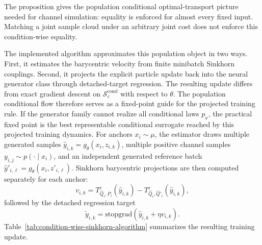 \documentclass[10pt,journal]{IEEEtran}
\begin{document}
The proposition gives the population conditional optimal-transport picture needed for channel simulation: equality is enforced for almost every fixed input.
Matching a joint sample cloud under an arbitrary joint cost does not enforce this condition-wise equality.

The implemented algorithm approximates this population object in two ways.
First, it estimates the barycentric velocity from finite minibatch Sinkhorn couplings.
Second, it projects the explicit particle update back into the neural generator class through detached-target regression.
The resulting update differs from exact gradient descent on \(\mathcal{S}^{\mathrm{cond}}_{\varepsilon}\) with respect to \(\theta\).
The population conditional flow therefore serves as a fixed-point guide for the projected training rule.
If the generator family cannot realize all conditional laws \(p_x\), the practical fixed point is the best representable conditional surrogate reached by this projected training dynamics.
For anchors \(x_i\sim\mu\), the estimator draws multiple generated samples
\(\hat y_{i,k}=g_\theta(x_i,z_{i,k})\), multiple positive channel samples
\(y_{i,j}\sim p(\cdot\mid x_i)\), and an independent generated reference batch
\(\hat y'_{i,\ell}=g_\theta(x_i,z'_{i,\ell})\).
Sinkhorn barycentric projections are then computed separately for each anchor:
\begin{equation}
v_{i,k}
=
T^{\varepsilon}_{\hat Q_i,P_i}(\hat y_{i,k})
-
T^{\varepsilon}_{\hat Q_i,\hat Q'_i}(\hat y_{i,k}),
\end{equation}
followed by the detached regression target
\begin{equation}
\tilde y_{i,k}
=
\mathrm{stopgrad}
\left(
\hat y_{i,k}+\eta v_{i,k}
\right).
\end{equation}
Table~\ref{tab:condition-wise-sinkhorn-algorithm} summarizes the resulting training update.
\end{document}
